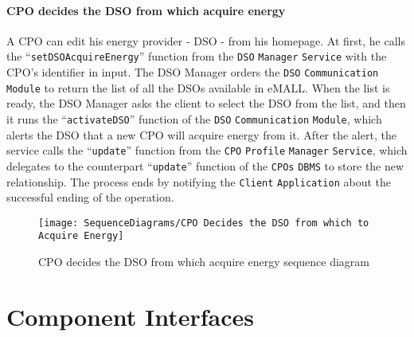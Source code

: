 \paragraph{CPO decides the DSO from which acquire energy}
A CPO can edit his energy provider - DSO - from his homepage.
At first, he calls the ``\verb|setDSOAcquireEnergy|'' function from the \verb|DSO| \verb|Manager| \verb|Service| with the CPO's identifier in input.
The DSO Manager orders the \verb|DSO| \verb|Communication| \verb|Module| to return the list of all the DSOs available in eMALL\@.
When the list is ready, the DSO Manager asks the client to select the DSO from the list, and then it runs the ``\verb|activateDSO|'' function of the \verb|DSO| \verb|Communication| \verb|Module|, which alerts the DSO that a new CPO will acquire energy from it.
After the alert, the service calls the ``\verb|update|'' function from the \verb|CPO| \verb|Profile| \verb|Manager| \verb|Service|, which delegates to the counterpart ``\verb|update|'' function of the \verb|CPOs| \verb|DBMS| to store the new relationship.
The process ends by notifying the \verb|Client| \verb|Application| about the successful ending of the operation.
\begin{figure}[H]
    \begin{center}
        \texttt{[image: SequenceDiagrams/CPO Decides the DSO from which to Acquire Energy]}
        \caption{CPO decides the DSO from which acquire energy sequence diagram}
        \label{cpo_decides_dso_from_which_acquire_energy}
    \end{center}
\end{figure}


\section{Component Interfaces}
\label{sec: component_interfaces}%


